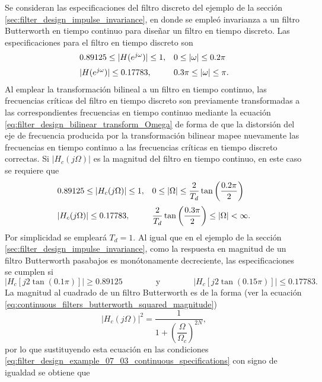 \documentclass[a4paper]{report}
\begin{document}
Se consideran las especificaciones del filtro discreto del ejemplo de la sección \ref{sec:filter_design_impulse_invariance}, en donde se empleó invarianza a un filtro Butterworth en tiempo continuo para diseñar un filtro en tiempo discreto. Las especificaciones para el filtro en tiempo discreto son
\begin{equation}\label{eq:filter_design_example_07_03_discrete_specifications}
 \begin{array}{ll}
  0.89125\leq|H(e^{j\omega})|\leq1, & 0\leq|\omega|\leq0.2\pi\\[\medskipamount]
  |H(e^{j\omega})|\leq0.17783, & 0.3\pi\leq|\omega|\leq\pi.
 \end{array} 
\end{equation}
Al emplear la transformación bilineal a un filtro en tiempo continuo, las frecuencias críticas del filtro en tiempo discreto son previamente transformadas a las correspondientes frecuencias en tiempo continuo mediante la ecuación \ref{eq:filter_design_bilinear_transform_Omega} de forma de que la distorsión del eje de frecuencia producida por la transformación bilinear mapee nuevamente las frecuencias en tiempo continuo a las frecuencias críticas en tiempo discreto correctas. Si \(|H_c(j\Omega)|\) es la magnitud del filtro en tiempo continuo, en este caso se requiere que
\[
 \begin{array}{ll}
  0.89125\leq|H_c(j\Omega)|\leq1, & 0\leq|\Omega|\leq\dfrac{2}{T_d}\tan\left(\dfrac{0.2\pi}{2}\right)\\[\bigskipamount]
  |H_c(j\Omega)|\leq0.17783, & \dfrac{2}{T_d}\tan\left(\dfrac{0.3\pi}{2}\right)\leq|\Omega|<\infty.
 \end{array} 
\]
Por simplicidad se empleará \(T_d=1\). Al igual que en el ejemplo de la sección \ref{sec:filter_design_impulse_invariance}, como la respuesta en magnitud de un filtro Butterworth pasabajos es monótonamente decreciente, las especificaciones se cumplen si
\begin{equation}\label{eq:filter_design_example_07_03_continuous_specifications}
 |H_c[j2\tan(0.1\pi)]|\geq0.89125
 \qquad\qquad\textrm{y}\qquad\qquad
 |H_c[j2\tan(0.15\pi)]|\leq0.17783. 
\end{equation}
La magnitud al cuadrado de un filtro Butterworth es de la forma (ver la  ecuación \ref{eq:continuous_filters_butterworth_squared_magnitude})
\[
 |H_c(j\Omega)|^2=\frac{1}{1+\left(\dfrac{\Omega}{\Omega_c}\right)^{2N}},
\]
por lo que sustituyendo esta ecuación en las condiciones \ref{eq:filter_design_example_07_03_continuous_specifications} con signo de igualdad se obtiene que
\end{document}
